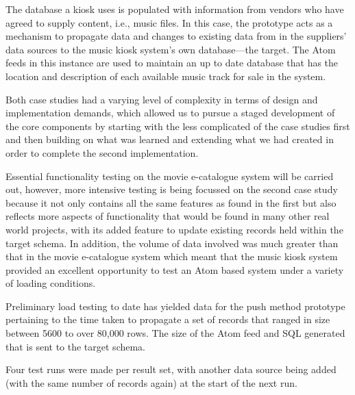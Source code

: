 \documentclass{CRPITStyle}
\begin{document}
The database a kiosk uses is populated with information from vendors who
have agreed to supply content, i.e., music files. In this case, the
prototype acts as a mechanism to propagate data and changes to existing
data from in the suppliers' data sources to the music kiosk system's own
database---the target. The Atom feeds in this instance are used to
maintain an up to date database that has the location and description of
each available music track for sale in the system.

Both case studies had a varying level of complexity in terms of design
and implementation demands, which allowed us to pursue a staged
development of the core components by starting with the less complicated
of the case studies first and then building on what was learned and
extending what we had created in order to complete the second
implementation.

Essential functionality testing on the movie e-catalogue system will be
carried out, however, more intensive testing is being focussed on the
second case study because it not only contains all the same features as
found in the first but also reflects more aspects of functionality that
would be found in many other real world projects, with its added feature
to update existing records held within the target schema. In addition,
the volume of data involved was much greater than that in the movie
e-catalogue system which meant that the music kiosk system provided an
excellent opportunity to test an Atom based system under a variety of
loading conditions.

Preliminary load testing to date has yielded data for the push method
prototype pertaining to the time taken to propagate a set of records
that ranged in size between 5600 to over 80,000 rows. The size of the
Atom feed and SQL generated that is sent to the target schema.

Four test runs were made per result set, with another data source being
added (with the same number of records again) at the start of the next
run.
\end{document}
